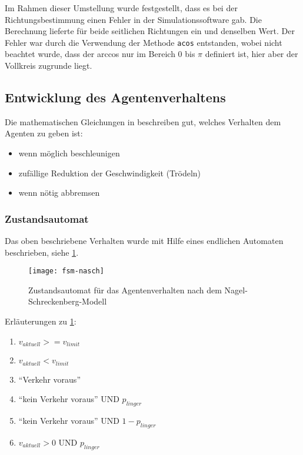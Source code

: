 Im Rahmen dieser Umstellung wurde festgestellt, dass es bei der Richtungsbestimmung einen Fehler in der Simulationssoftware gab.
Die Berechnung lieferte für beide seitlichen Richtungen ein und denselben Wert.
Der Fehler war durch die Verwendung der Methode \texttt{acos} entstanden, wobei nicht beachtet wurde, dass der arccos nur im Bereich 0 bis $ \pi $ definiert ist, hier aber der Vollkreis zugrunde liegt.





\subsection{Entwicklung des Agentenverhaltens}
\label{sec:entwicklung-agentenplan}

Die mathematischen Gleichungen in \cite{na-sch} beschreiben gut, welches Verhalten dem Agenten zu geben ist: 
\begin{itemize}
\itemsep0em
	\item wenn möglich beschleunigen
	\item zufällige Reduktion der Geschwindigkeit (Trödeln)
	\item wenn nötig abbremsen
\end{itemize}


\subsubsection{Zustandsautomat}

Das oben beschriebene Verhalten wurde mit Hilfe eines endlichen Automaten beschrieben, siehe \cref{figure:fsm-nasch}.

\begin{figure}[hptb]
 \centering
 \texttt{[image: fsm-nasch]}
 \caption[Zustandsautomat für das Agentenverhalten]
 		{Zustandsautomat für das Agentenverhalten nach dem Nagel-Schreckenberg-Modell}
 \label{figure:fsm-nasch}
\end{figure}

Erläuterungen zu \cref{figure:fsm-nasch}:
\begin{enumerate}
\itemsep0em
	\item  $ v_{aktuell}  >=  v_{limit} $
	\item  $ v_{aktuell}  <  v_{limit} $
	\item  \enquote{Verkehr voraus}
	\item  \enquote{kein Verkehr voraus} UND $ p_{linger} $
	\item  \enquote{kein Verkehr voraus} UND $ 1 - p_{linger} $
	\item  $ v_{aktuell}  > 0 $ UND $ p_{linger} $
\end{enumerate}

